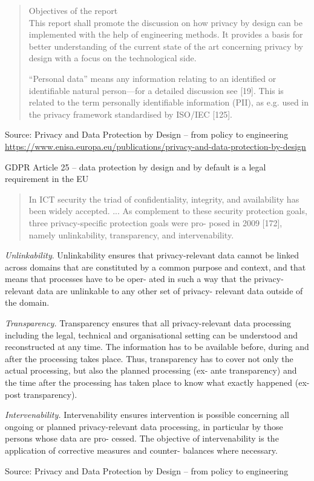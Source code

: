 \documentclass[Screen16to9,17pt]{foils}
\begin{document}
\begin{quote}
Objectives of the report\\
This report shall promote the discussion on how privacy by design can be implemented with the help
of engineering methods. It provides a basis for better understanding of the current state of the art
concerning privacy by design with a focus on the technological side.

“Personal data” means any information relating to an identified or identifiable natural person—for a
detailed discussion see [19]. This is related to the term personally identifiable information (PII), as e.g.
used in the privacy framework standardised by ISO/IEC [125].
\end{quote}

Source: Privacy and Data Protection by Design -- from policy to engineering\\
{\footnotesize\url{https://www.enisa.europa.eu/publications/privacy-and-data-protection-by-design}}

\begin{list2}
\item GDPR Article 25 -- data protection by design and by default is a legal requirement in the EU
\end{list2}



\begin{quote}\footnotesize
In ICT
security the triad of confidentiality, integrity, and availability has been widely accepted. ...
As complement to these security protection goals, three privacy-specific protection goals were pro-
posed in 2009 [172], namely unlinkability, transparency, and intervenability.
\end{quote}

\begin{list2}
\item {\small \emph{Unlinkability}. Unlinkability ensures that privacy-relevant data cannot be linked across domains that are constituted by a common purpose and context, and that means that processes have to be oper-
ated in such a way that the privacy-relevant data are unlinkable to any other set of privacy-
relevant data outside of the domain.}
\item {\small \emph{Transparency.} Transparency ensures that all privacy-relevant data processing including the
legal, technical and organisational setting can be understood and reconstructed at any time.
The information has to be available before, during and after the processing takes place. Thus,
transparency has to cover not only the actual processing, but also the planned processing (ex-
ante transparency) and the time after the processing has taken place to know what exactly
happened (ex-post transparency).}
\item {\small \emph{Intervenability.} Intervenability ensures intervention is possible concerning all ongoing or
planned privacy-relevant data processing, in particular by those persons whose data are pro-
cessed. The objective of intervenability is the application of corrective measures and counter-
balances where necessary.}
\end{list2}
Source: Privacy and Data Protection by Design -- from policy to engineering
\end{document}
